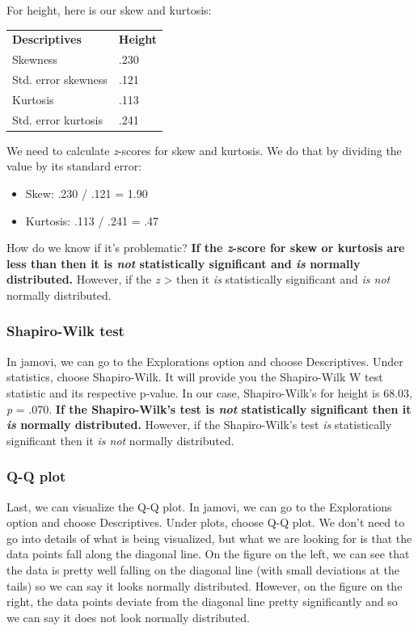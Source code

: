 \documentclass[
]{book}
\begin{document}
For height, here is our skew and kurtosis:

\begin{longtable}[]{@{}ll@{}}
\toprule
\endhead
\textbf{Descriptives} & \textbf{Height}\tabularnewline
Skewness & .230\tabularnewline
Std. error skewness & .121\tabularnewline
Kurtosis & .113\tabularnewline
Std. error kurtosis & .241\tabularnewline
\bottomrule
\end{longtable}

We need to calculate \emph{z}-scores for skew and kurtosis. We do that by dividing the value by its standard error:

\begin{itemize}
\item
  Skew: .230 / .121 = 1.90
\item
  Kurtosis: .113 / .241 = .47
\end{itemize}

How do we know if it's problematic? \textbf{If the \emph{z}-score for skew or kurtosis are less than \textbar{} then it is \emph{not} statistically significant and \emph{is} normally distributed.} However, if the \emph{z} \textgreater{} \textbar{} then it \emph{is} statistically significant and \emph{is not} normally distributed.

\hypertarget{shapiro-wilk-test}{%
\subsubsection{Shapiro-Wilk test}\label{shapiro-wilk-test}}

In jamovi, we can go to the Explorations option and choose Descriptives. Under statistics, choose Shapiro-Wilk. It will provide you the Shapiro-Wilk W test statistic and its respective p-value. In our case, Shapiro-Wilk's for height is 68.03, \emph{p} = .070. \textbf{If the Shapiro-Wilk's test is \emph{not} statistically significant then it \emph{is} normally distributed.} However, if the Shapiro-Wilk's test \emph{is} statistically significant then it \emph{is not} normally distributed.

\hypertarget{q-q-plot}{%
\subsubsection{Q-Q plot}\label{q-q-plot}}

Last, we can visualize the Q-Q plot. In jamovi, we can go to the Explorations option and choose Descriptives. Under plots, choose Q-Q plot. We don't need to go into details of what is being visualized, but what we are looking for is that the data points fall along the diagonal line. On the figure on the left, we can see that the data is pretty well falling on the diagonal line (with small deviations at the tails) so we can say it looks normally distributed. However, on the figure on the right, the data points deviate from the diagonal line pretty significantly and so we can say it does not look normally distributed.
\end{document}
